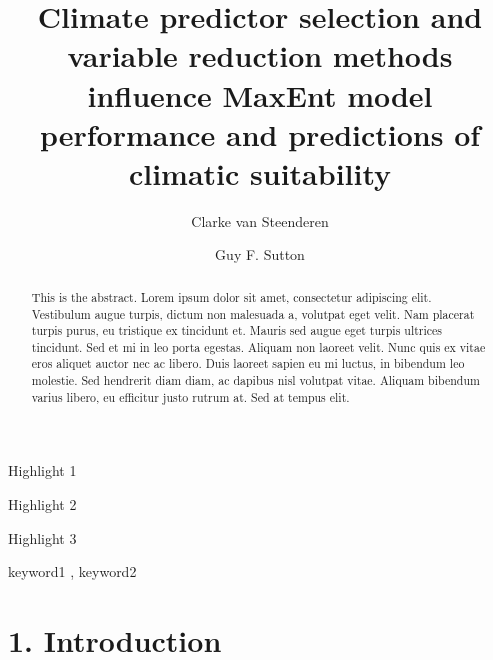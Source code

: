\documentclass[
  authoryear,
  preprint,
  3p,
  twocolumn]{elsarticle}
\begin{document}
\begin{frontmatter}
\title{Climate predictor selection and variable reduction methods
influence MaxEnt model performance and predictions of climatic
suitability}
\author[1]{Clarke van Steenderen%
%
}
\author[1]{Guy F. Sutton%
%
}




        
\begin{abstract}
This is the abstract. Lorem ipsum dolor sit amet, consectetur adipiscing
elit. Vestibulum augue turpis, dictum non malesuada a, volutpat eget
velit. Nam placerat turpis purus, eu tristique ex tincidunt et. Mauris
sed augue eget turpis ultrices tincidunt. Sed et mi in leo porta
egestas. Aliquam non laoreet velit. Nunc quis ex vitae eros aliquet
auctor nec ac libero. Duis laoreet sapien eu mi luctus, in bibendum leo
molestie. Sed hendrerit diam diam, ac dapibus nisl volutpat vitae.
Aliquam bibendum varius libero, eu efficitur justo rutrum at. Sed at
tempus elit.
\end{abstract}



\begin{highlights}
\item Highlight 1\item Highlight 2\item Highlight 3
\end{highlights}


\begin{keyword}
    keyword1 \sep 
    keyword2
\end{keyword}
\end{frontmatter}
    \ifdefined\Shaded\renewenvironment{Shaded}{\begin{tcolorbox}[borderline west={3pt}{0pt}{shadecolor}, breakable, enhanced, interior hidden, sharp corners, frame hidden, boxrule=0pt]}{\end{tcolorbox}}\fi

\hypertarget{introduction}{%
\section{1. Introduction}\label{introduction}}
\end{document}
